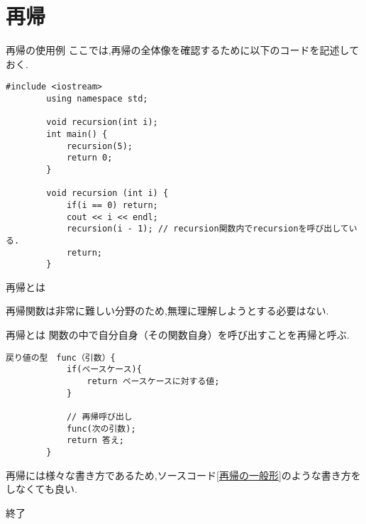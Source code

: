 \documentclass[xdvipdfmx, 8pt, t]{beamer}
\begin{document}
\section{再帰}
\begin{frame}[fragile]{再帰の使用例}
ここでは,再帰の全体像を確認するために以下のコードを記述しておく.
\tiny
    \begin{lstlisting}[caption=再帰関数の例]
        #include <iostream>
        using namespace std;

        void recursion(int i);
        int main() {
            recursion(5);
            return 0;
        }

        void recursion (int i) {
            if(i == 0) return;
            cout << i << endl;
            recursion(i - 1); // recursion関数内でrecursionを呼び出している.
            return;
        }
    \end{lstlisting}    
\end{frame}
\begin{frame}[fragile]{再帰とは}
    \begin{alertblock}{}
        再帰関数は非常に難しい分野のため,無理に理解しようとする必要はない.
    \end{alertblock}
    \begin{block}{再帰とは}
        関数の中で自分自身（その関数自身）を呼び出すことを再帰と呼ぶ.
    \end{block}
    \begin{lstlisting}[caption=再帰の一般形の一つ, label=再帰の一般形]
        戻り値の型　func（引数）{
            if(ベースケース){
                return ベースケースに対する値;
            }

            // 再帰呼び出し
            func(次の引数);
            return 答え;
        }
    \end{lstlisting}
    \begin{alertblock}{}
        再帰には様々な書き方であるため,ソースコード\ref{再帰の一般形}のような書き方をしなくても良い.
    \end{alertblock}
\end{frame}
\begin{frame}{終了}
\end{frame}
\end{document}
